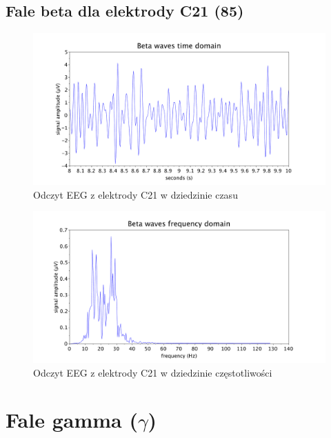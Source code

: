 \documentclass{article}
\begin{document}
    \subsection{Fale beta dla elektrody C21 (85)}
    \begin{figure}[H]
        \hspace*{-1.5cm}
        \includegraphics[width=\linewidth+3cm]{beta_time.pdf}
        \caption{Odczyt EEG z elektrody C21 w dziedzinie czasu}
    \end{figure}
    \begin{figure}[H]
        \hspace*{-1.5cm}
        \includegraphics[width=\linewidth+3cm]{beta_freq.pdf}
        \caption{Odczyt EEG z elektrody C21 w dziedzinie częstotliwości}
    \end{figure}

\newpage
    \section{Fale gamma ($\gamma$)}
\end{document}
